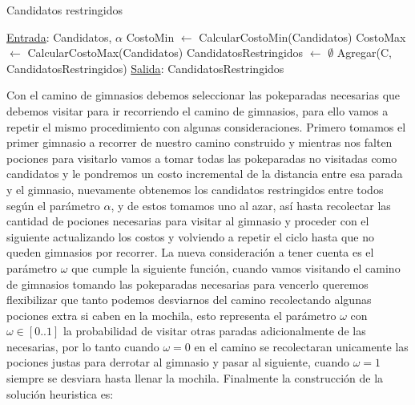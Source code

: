 \begin{algorithm}[H]

\label{}
\caption{Candidatos restringidos}

\begin{algorithmic}[1]

\Statex \underline{Entrada}: Candidatos, $\alpha$
\medskip
\State CostoMin $\gets$ CalcularCostoMin(Candidatos)
\State CostoMax $\gets$ CalcularCostoMax(Candidatos)
\State CandidatosRestringidos $\gets$ $\emptyset$
		\State Agregar(C, CandidatosRestringidos)
	\EndIf
\EndFor
\medskip
\Statex \underline{Salida}: CandidatosRestringidos

\end{algorithmic}
\end{algorithm}

Con el camino de gimnasios debemos seleccionar las pokeparadas necesarias que debemos visitar para ir recorriendo el camino de gimnasios, para ello vamos a repetir el mismo procedimiento con algunas consideraciones. Primero tomamos el primer gimnasio a recorrer de nuestro camino construido y mientras nos falten pociones para visitarlo vamos a tomar todas las pokeparadas no visitadas como candidatos y le pondremos un costo incremental de la distancia entre esa parada y el gimnasio, nuevamente obtenemos los candidatos restringidos entre todos según el parámetro $\alpha$, y de estos tomamos uno al azar, así hasta recolectar las cantidad de pociones necesarias para visitar al gimnasio y proceder con el siguiente actualizando los costos y volviendo a repetir el ciclo hasta que no queden gimnasios por recorrer. La nueva consideración a tener cuenta es el parámetro $\omega$ que cumple la siguiente función, cuando vamos visitando el camino de gimnasios tomando las pokeparadas necesarias para vencerlo queremos flexibilizar que tanto podemos desviarnos del camino recolectando algunas pociones extra si caben en la mochila, esto representa el parámetro $\omega$ con $\omega \in [0..1]$ la probabilidad de visitar otras paradas adicionalmente de las necesarias, por lo tanto cuando $\omega = 0$ en el camino se recolectaran unicamente las pociones justas para derrotar al gimnasio y pasar al siguiente, cuando $\omega = 1$ siempre se desviara hasta llenar la mochila. Finalmente la construcción de la solución heuristica es:

